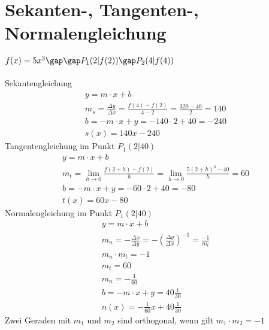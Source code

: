 \section{Sekanten-, Tangenten-, Normalengleichung}
$f(x) = 5x^3\gap\gap P_1(2|f(2))\gap P_2(4|f(4))$ \\\\
Sekantengleichung
\begin{gather*}
  y = m \cdot x + b \\
  m_s = \frac{\Delta y}{\Delta x} = \frac{f(4) - f(2)}{4 - 2} = \frac{320 - 40}{2} = 140 \\
  b = -m \cdot x + y = -140 \cdot 2 + 40 = -240 \\
  s(x) = 140x - 240
\end{gather*}
Tangentengleichung im Punkt $P_1(2|40)$
\begin{gather*}
  y = m \cdot x + b \\
  m_t = \lim\limits_{h \to 0} \frac{f(2 + h) - f(2)}{h} = \lim\limits_{h \to 0} \frac{5(2 + h)^3 - 40}{h} = 60 \\
  b = -m \cdot x + y = -60 \cdot 2 + 40 = -80 \\
  t(x) = 60x - 80
\end{gather*}
Normalengleichung im Punkt $P_1(2|40)$
\begin{gather*}
  y = m \cdot x + b \\
  m_n = -\frac{\Delta x}{\Delta y} = -(\frac{\Delta y}{\Delta x})^{-1} = \frac{-1}{m_t} \\
  m_n \cdot m_t = -1 \\
  m_t = 60 \\
  m_n = -\frac{1}{60} \\
  b = -m \cdot x + y = 40\frac{1}{30} \\
  n(x) = -\frac{1}{60}x + 40\frac{1}{30}
\end{gather*}
Zwei Geraden mit $m_1$ und $m_2$ sind orthogonal, wenn gilt $m_1 \cdot m_2 = -1$

